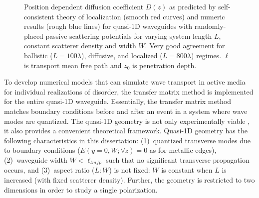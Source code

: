 \begin{figure}
\vskip -0.5cm
\centerline{
}
\vskip -0.5cm
\caption{Position dependent diffusion coefficient $D(z)$ as predicted by self-consistent theory of localization (smooth red curves) and numeric results (rough blue lines) for quasi-1D waveguides with randomly-placed passive scattering potentials for varying system length $L$, constant scatterer density and width $W$. Very good agreement for ballistic ($L=100 \lambda$), diffusive, and localized ($L=800 \lambda$) regimes. $\ell$ is transport mean free path and $z_0$ is penetration depth.}
\label{fig:Dz_passive}
\end{figure}

To develop numerical models that can simulate wave transport in active media for individual realizations of disorder, the transfer matrix method \cite{1981_MacKinnon_scaling}
\cite{1992_Pendry}\cite{2003_Kettemann} is implemented for the entire quasi-1D waveguide. Essentially, the transfer matrix method matches boundary conditions before and after an event in a system where wave modes are quantized. The quasi-1D geometry is not only experimentally viable \cite{2009_Genack_PRB}, it also provides a convenient theoretical framework\cite{1982_Dorokhov_DMPK}\cite{1988_Mello_Kumar_DMPK}. Quasi-1D geometry has the following characteristics in this dissertation: (1)~quantized transverse modes due to boundary conditions ($E(y=0,W;\forall z)=0$ as for metallic edges), (2)~waveguide width $W < \ell_{tmfp}$ such that no significant transverse propagation occurs, and (3)~aspect ratio ($L:W$) is not fixed: $W$ is constant when $L$ is increased (with fixed scatterer density). Further, the geometry is restricted to two dimensions in order to study a single polarization.

